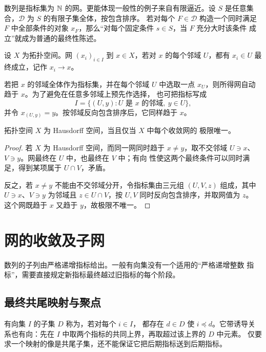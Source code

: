 数列是指标集为 \(\mathbb{N}\) 的网。更能体现一般性的例子来自有限逼近。设
\(S\) 是任意集合，\(\mathcal D\) 为 \(S\) 的有限子集全体，按包含排序。
若对每个 \(F\in\mathcal D\) 构造一个同时满足 \(F\) 中全部条件的对象
\(x_F\)，那么“对每个固定条件 \(s\in S\)，当 \(F\) 充分大时该条件
成立”就成为普通的最终性陈述。

\begin{definition}[网的收敛]
设 \(X\) 为拓扑空间。网 \((x_i)_{i\in I}\) 到
\(x\in X\)，若对 \(x\) 的每个邻域 \(U\)，都有 \(x_i\in U\)
最终成立，记作 \(x_i\to x\)。
\end{definition}

若把 \(x\) 的邻域全体作为指标集，并在每个邻域 \(U\) 中选取一点
\(x_U\)，则所得网自动趋于 \(x\)。为了避免在任意多邻域上预先作选择，
也可把指标写成
\[
 I=\{(U,y):U\text{ 是 }x\text{ 的邻域},\ y\in U\},
\]
并令 \(x_{(U,y)}=y\)。按邻域反向包含排序后，它同样趋于 \(x\)。

\begin{proposition}[极限的唯一性]
\label{prop:net-limits-hausdorff}
拓扑空间 \(X\) 为 Hausdorff 空间，当且仅当 \(X\) 中每个收敛网的
极限唯一。
\end{proposition}

\begin{proof}
若 \(X\) 为 Hausdorff 空间，而同一网同时趋于 \(x\ne y\)，取不交邻域
\(U\ni x\)、\(V\ni y\)。网最终在 \(U\) 中，也最终在 \(V\) 中；有向
性使这两个最终条件可以同时满足，得到某项属于 \(U\cap V\)，矛盾。

反之，若 \(x\ne y\) 不能由不交邻域分开，令指标集由三元组
\((U,V,z)\) 组成，其中 \(U\ni x\)、\(V\ni y\) 为邻域且
\(z\in U\cap V\)，按 \(U,V\) 同时反向包含排序，并取网值为 \(z\)。
这个网既趋于 \(x\) 又趋于 \(y\)，故极限不唯一。
\end{proof}

\section{网的收敛及子网}

数列的子列由严格递增指标给出。一般有向集没有一个适用的“严格递增整数
指标”，需要直接规定新指标最终越过旧指标的每个阶段。

\subsection{最终共尾映射与聚点}

有向集 \(I\) 的子集 \(D\) 称为，若对每个 \(i\in I\)，
都存在 \(d\in D\) 使 \(i\preccurlyeq d\)。它带诱导关系也有向：先在
\(I\) 中取两个指标的共同上界，再取超过该上界的 \(D\) 中元素。
仅要求一个映射的像是共尾子集，还不能保证它把后期指标送到后期指标。

